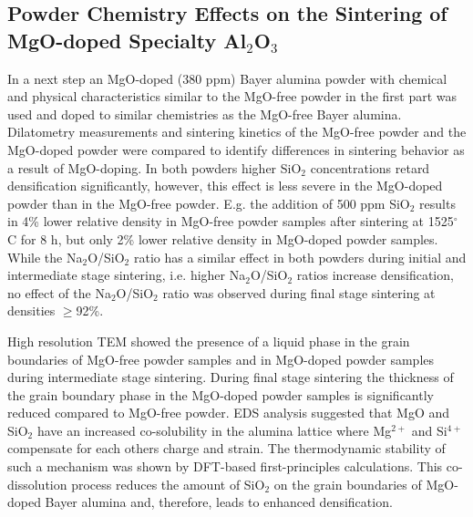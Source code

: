 \subsection{Powder Chemistry Effects on the Sintering of MgO-doped Specialty Al$_{2}$O$_{3}$}
In a next step an MgO-doped (380 ppm) Bayer alumina powder with chemical and physical characteristics similar to the MgO-free powder in the first part was used and doped to similar chemistries as the MgO-free Bayer alumina. Dilatometry measurements and sintering kinetics of the MgO-free powder and the MgO-doped powder were compared to identify differences in sintering behavior as a result of MgO-doping. In both powders higher SiO$_{2}$ concentrations retard densification significantly, however, this effect is less severe in the MgO-doped powder than in the MgO-free powder. E.g. the addition of 500 ppm SiO$_{2}$ results in 4\% lower relative density in MgO-free powder samples after sintering at 1525$^{\circ}$C for 8 h, but only 2\% lower relative density in MgO-doped powder samples. While the Na$_{2}$O/SiO$_{2}$ ratio has a similar effect in both powders during initial and intermediate stage sintering, i.e. higher Na$_{2}$O/SiO$_{2}$ ratios increase densification, no effect of the Na$_{2}$O/SiO$_{2}$ ratio was observed during final stage sintering at densities $\geq$92\%. 

High resolution TEM showed the presence of a liquid phase in the grain boundaries of MgO-free powder samples and in MgO-doped powder samples during intermediate stage sintering. During final stage sintering the thickness of the grain boundary phase in the MgO-doped powder samples is significantly reduced compared to MgO-free powder. EDS analysis suggested that MgO and SiO$_{2}$ have an increased co-solubility in the alumina lattice where Mg$^{2+}$ and Si$^{4+}$ compensate for each others charge and strain. The thermodynamic stability of such a mechanism was shown by DFT-based first-principles calculations. This co-dissolution process reduces the amount of SiO$_{2}$ on the grain boundaries of MgO-doped Bayer alumina and, therefore, leads to enhanced densification. 

